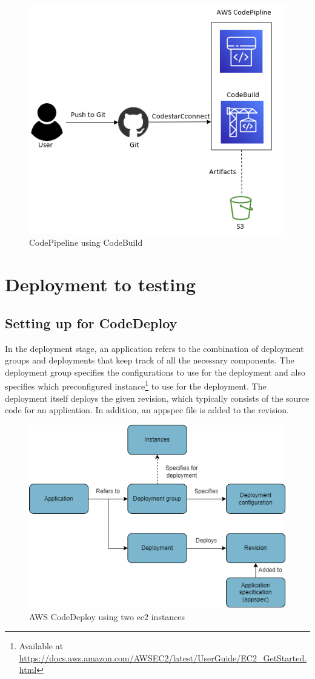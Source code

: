 \vspace{2mm}
\begin{figure}[H]
    \centering
    \includegraphics[width=0.6\columnwidth]{Images/aws-piplin-3.png}
    \caption{CodePipeline using CodeBuild}
    \label{fig: CodePipeline using CodeBuild}
\end{figure}

\section{Deployment to testing}
\label{Deployment to testing}
\subsection{Setting up for CodeDeploy}
In the deployment stage, an application refers to the combination of deployment groups and deployments that keep track of all the necessary components. The deployment group specifies the configurations to use for the deployment and also specifies which preconfigured instance\footnote{Available at \url{https://docs.aws.amazon.com/AWSEC2/latest/UserGuide/EC2_GetStarted.html}} to use for the deployment. The deployment itself deploys the given revision, which typically consists of the source code for an application. In addition, an \gls{appspec} file is added to the revision. 

\vspace{2mm}
\begin{figure}[H]
    \centering
    \includegraphics[width=0.6\columnwidth]{Images/CodeDeploy.drawio.png}
    \caption{AWS CodeDeploy using two \acrshort{ec2} instances}
    \label{fig: AWS CodeDeploy using two EC2 instances}
\end{figure}
\newpage

